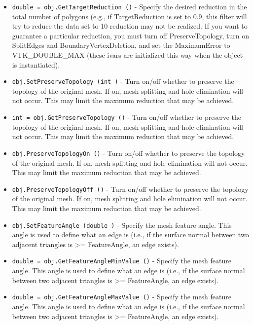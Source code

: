 \begin{itemize}
\item  \verb|double = obj.GetTargetReduction ()| -  Specify the desired reduction in the total number of polygons (e.g., if
 TargetReduction is set to 0.9, this filter will try to reduce the data set
 to 10%
 reduction may not be realized. If you want to guarantee a particular
 reduction, you must turn off PreserveTopology, turn on SplitEdges and
 BoundaryVertexDeletion, and set the MaximumError to VTK\_DOUBLE\_MAX (these
 ivars are initialized this way when the object is instantiated).

\item  \verb|obj.SetPreserveTopology (int )| -  Turn on/off whether to preserve the topology of the original mesh. If
 on, mesh splitting and hole elimination will not occur. This may limit
 the maximum reduction that may be achieved.

\item  \verb|int = obj.GetPreserveTopology ()| -  Turn on/off whether to preserve the topology of the original mesh. If
 on, mesh splitting and hole elimination will not occur. This may limit
 the maximum reduction that may be achieved.

\item  \verb|obj.PreserveTopologyOn ()| -  Turn on/off whether to preserve the topology of the original mesh. If
 on, mesh splitting and hole elimination will not occur. This may limit
 the maximum reduction that may be achieved.

\item  \verb|obj.PreserveTopologyOff ()| -  Turn on/off whether to preserve the topology of the original mesh. If
 on, mesh splitting and hole elimination will not occur. This may limit
 the maximum reduction that may be achieved.

\item  \verb|obj.SetFeatureAngle (double )| -  Specify the mesh feature angle. This angle is used to define what
 an edge is (i.e., if the surface normal between two adjacent triangles
 is >= FeatureAngle, an edge exists).

\item  \verb|double = obj.GetFeatureAngleMinValue ()| -  Specify the mesh feature angle. This angle is used to define what
 an edge is (i.e., if the surface normal between two adjacent triangles
 is >= FeatureAngle, an edge exists).

\item  \verb|double = obj.GetFeatureAngleMaxValue ()| -  Specify the mesh feature angle. This angle is used to define what
 an edge is (i.e., if the surface normal between two adjacent triangles
 is >= FeatureAngle, an edge exists).


\end{itemize}
